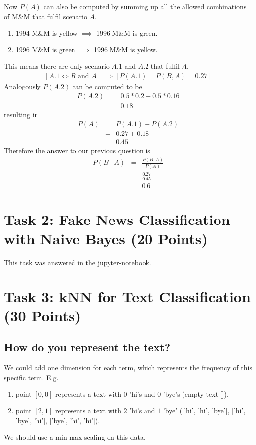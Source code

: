 \documentclass{article}
\begin{document}
	Now $P(A)$ can also be computed by summing up all the allowed combinations of M\&M that fulfil scenario $A$.\\
	\begin{enumerate}[label=A.\arabic*]
		\item 1994 M\&M is yellow $\implies$ 1996 M\&M is green.
		\item 1996 M\&M is green $\implies$ 1996 M\&M is yellow.
	\end{enumerate}
	This means there are only scenario $A.1$ and $A.2$ that fulfil $A$.
	\begin{eqnarray*}
		\left[A.1 \Leftrightarrow B \text{ and } A\right] \implies \left[P(A.1) = P(B, A) = 0.27\right]
	\end{eqnarray*}
	Analogously $P(A.2)$ can be computed to be
	\begin{eqnarray*}
		P(A.2) &=& 0.5 * 0.2 + 0.5 * 0.16\\
		&=& 0.18
	\end{eqnarray*}
	resulting in
	\begin{eqnarray*}
		P(A) &=& P(A.1) + P(A.2)\\
		&=& 0.27 + 0.18\\
		&=& 0.45
	\end{eqnarray*}
	Therefore the answer to our previous question is
	\begin{eqnarray*}
		P(B \mid A) &=& \frac{P(B, A)}{P(A)}\\
		&=& \frac{0.27}{0.45}\\
		&=& 0.6
	\end{eqnarray*}
\section{Task 2: Fake News Classification with Naive Bayes (20 Points)}
	This task was answered in the jupyter-notebook.
\section{Task 3: kNN for Text Classification (30 Points)}
	\subsection{How do you represent the text?}
	We could add one dimension for each term, which represents the frequency of this specific term. E.g.
	\begin{enumerate}[label=-]
		\item point $[0, 0]$ represents a text with $0$ 'hi's and $0$ 'bye's (empty text []).
		\item point $[2, 1]$ represents a text with $2$ 'hi's and $1$ 'bye' (['hi', 'hi', 'bye'], ['hi', 'bye', 'hi'], ['bye', 'hi', 'hi']).
	\end{enumerate}
	We should use a min-max scaling on this data.
\end{document}
